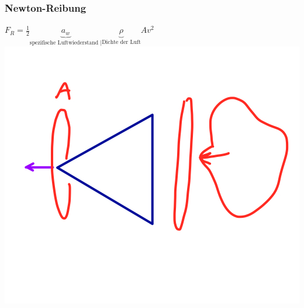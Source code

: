\documentclass[11pt]{article}
\begin{document}
		\subsubsection{Newton-Reibung}
			$ F_R = \frac{1}{2} \underbrace{a_w}_{\text{spezifische Luftwiederstand |}}  \underbrace{\rho}_{\text{Dichte der Luft}} A v^2 $
			\includegraphics[scale=0.3]{IMG_7A852B76F915-1.jpeg}
		
\end{document}

